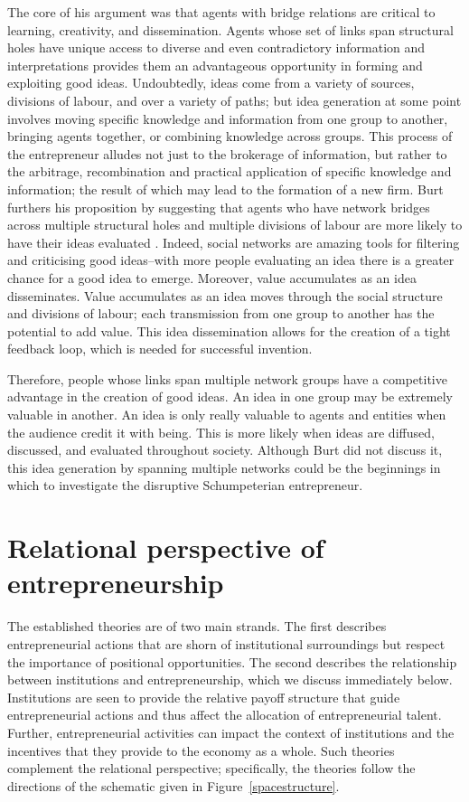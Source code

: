 The core of his argument was that agents with bridge relations are critical to learning, creativity, and dissemination. Agents whose set of links span structural holes have unique access to diverse and even contradictory information and interpretations provides them an advantageous opportunity in forming and exploiting good ideas. Undoubtedly, ideas come from a variety of sources, divisions of labour, and over a variety of paths; but idea generation at some point involves moving specific knowledge and information from one group to another, bringing agents together, or combining knowledge across groups. This process of the entrepreneur alludes not just to the brokerage of information, but rather to the arbitrage, recombination and practical application of specific knowledge and information; the result of which may lead to the formation of a new firm. Burt furthers his proposition by suggesting that agents who have network bridges across multiple structural holes and multiple divisions of labour are more likely to have their ideas evaluated \citep{Burt2005}. Indeed, social networks are amazing tools for filtering and criticising good ideas--with more people evaluating an idea there is a greater chance for a good idea to emerge. Moreover, value accumulates as an idea disseminates. Value accumulates as an idea moves through the social structure and divisions of labour; each transmission from one group to another has the potential to add value. This idea dissemination allows for the creation of a tight feedback loop, which is needed for successful invention.

Therefore, people whose links span multiple network groups have a competitive advantage in the creation of good ideas. An idea in one group may be extremely valuable in another. An idea is only really valuable to agents and entities when the audience credit it with being. This is more likely when ideas are diffused, discussed, and evaluated throughout society. Although Burt did not discuss it, this idea generation by spanning multiple networks could be the beginnings in which to investigate the disruptive Schumpeterian entrepreneur.

\section{Relational perspective of entrepreneurship}
\label{sec:RPEntrepreneurship}

The established theories are of two main strands. The first describes entrepreneurial actions that are shorn of institutional surroundings but respect the importance of positional opportunities. The second describes the relationship between institutions and entrepreneurship, which we discuss immediately below. Institutions are seen to provide the relative payoff structure that guide entrepreneurial actions and thus affect the allocation of entrepreneurial talent. Further, entrepreneurial activities can impact the context of institutions and the incentives that they provide to the economy as a whole. Such theories complement the relational perspective; specifically, the theories follow the directions of the schematic given in Figure~\ref{spacestructure}. 

